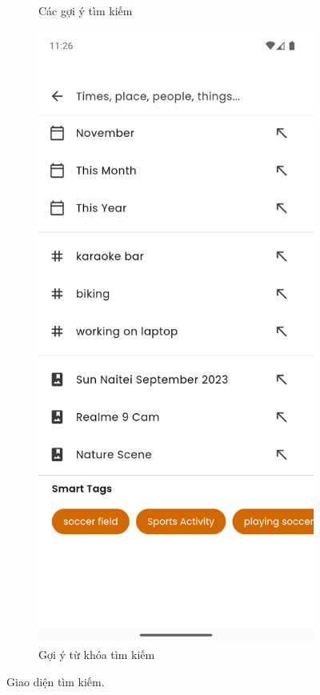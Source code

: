 \begin{figure}[H]
\begin{subfigure}{0.48\textwidth}
        \caption{Các gợi ý tìm kiếm}
    \end{subfigure}
    \hfill
    \begin{subfigure}{0.48\textwidth}
        \includegraphics[width=1\linewidth]{figures/c4/4-2/search_2.png} 
        \caption{Gợi ý từ khóa tìm kiếm}
    \end{subfigure}
    \caption{Giao diện tìm kiếm.}
    \label{fig:search-screen}
\end{figure}

